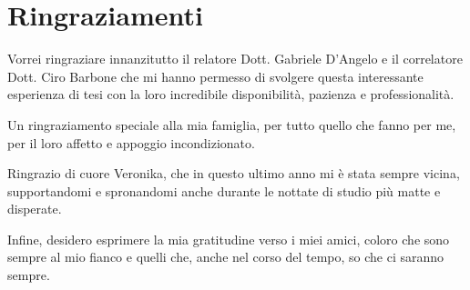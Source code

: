 \chapter{Ringraziamenti}
Vorrei ringraziare innanzitutto il relatore Dott. Gabriele D'Angelo e il correlatore Dott. Ciro Barbone 
 che mi hanno permesso di svolgere  questa interessante esperienza di tesi con la loro incredibile 
 disponibilità, pazienza e professionalità.

 Un ringraziamento speciale alla mia famiglia, per tutto quello che fanno per me, per il loro affetto  e appoggio incondizionato.
 
 Ringrazio di cuore Veronika, che in questo ultimo anno mi è stata sempre vicina, supportandomi  e spronandomi anche durante le nottate di studio più matte e disperate.

 Infine, desidero esprimere la mia gratitudine verso i miei amici, coloro che sono sempre  al mio fianco e quelli che, anche nel corso del tempo, so che ci saranno sempre.
 
